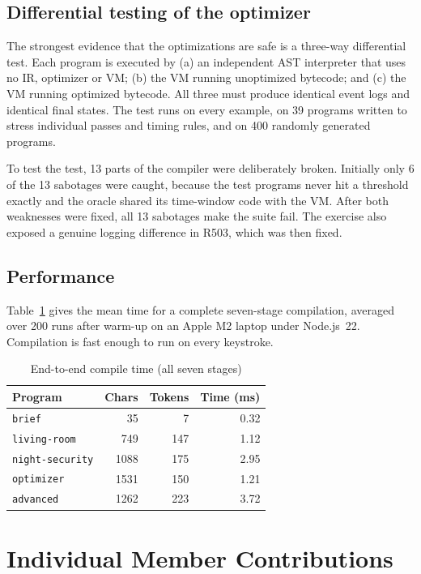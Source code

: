 \documentclass[conference]{IEEEtran}
\newcommand{\code}[1]{\texttt{#1}}
\begin{document}
\subsection{Differential testing of the optimizer}
The strongest evidence that the optimizations are safe is a three-way differential test. Each program is executed by (a) an independent AST interpreter that uses no IR, optimizer or VM; (b) the VM running unoptimized bytecode; and (c) the VM running optimized bytecode. All three must produce identical event logs and identical final states. The test runs on every example, on 39 programs written to stress individual passes and timing rules, and on 400 randomly generated programs.

To test the test, 13 parts of the compiler were deliberately broken. Initially only 6 of the 13 sabotages were caught, because the test programs never hit a threshold exactly and the oracle shared its time-window code with the VM. After both weaknesses were fixed, all 13 sabotages make the suite fail. The exercise also exposed a genuine logging difference in R503, which was then fixed.

\subsection{Performance}
Table~\ref{tab:perf} gives the mean time for a complete seven-stage compilation, averaged over 200 runs after warm-up on an Apple M2 laptop under Node.js~22. Compilation is fast enough to run on every keystroke.

\begin{table}[t]
\centering
\caption{End-to-end compile time (all seven stages)}
\label{tab:perf}
\footnotesize
\begin{tabular}{@{}l r r r@{}}
\toprule
Program & Chars & Tokens & Time (ms) \\
\midrule
\code{brief} & 35 & 7 & 0.32 \\
\code{living-room} & 749 & 147 & 1.12 \\
\code{night-security} & 1088 & 175 & 2.95 \\
\code{optimizer} & 1531 & 150 & 1.21 \\
\code{advanced} & 1262 & 223 & 3.72 \\
\bottomrule
\end{tabular}
\end{table}

\section{Individual Member Contributions}
\end{document}

